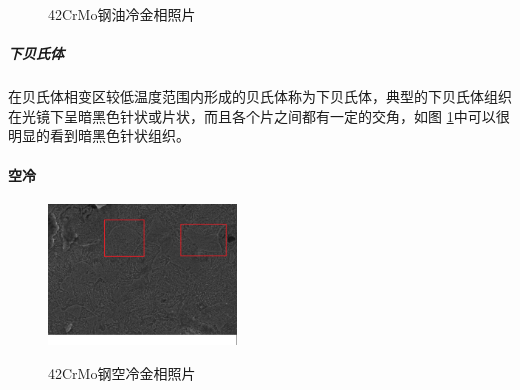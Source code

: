 \documentclass[12pt]{ctexart}
\begin{document}
\begin{figure}[ht!]
  \centering
  \caption{42CrMo钢油冷金相照片}
  \label{42oil}
\end{figure}
\subparagraph{下贝氏体}
在贝氏体相变区较低温度范围内形成的贝氏体称为下贝氏体，典型的下贝氏体组织在光镜下呈暗黑色针状或片状，而且各个片之间都有一定的交角，如图 \ref{42oil}中可以很明显的看到暗黑色针状组织。
\paragraph{空冷}
\begin{figure}
  \centering
  \includegraphics[width=5cm]{42airdian.jpg}\\
  \caption{42CrMo钢空冷金相照片}\label{42air}
\end{figure}
\end{document}
